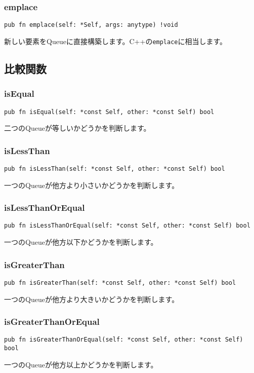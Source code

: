 \documentclass{ltjsarticle}
\begin{document}
\subsubsection{emplace}
\begin{lstlisting}[style=zigstyle]
pub fn emplace(self: *Self, args: anytype) !void
\end{lstlisting}
新しい要素をQueueに直接構築します。C++の\texttt{emplace}に相当します。

\subsection{比較関数}

\subsubsection{isEqual}
\begin{lstlisting}[style=zigstyle]
pub fn isEqual(self: *const Self, other: *const Self) bool
\end{lstlisting}
二つのQueueが等しいかどうかを判断します。

\subsubsection{isLessThan}
\begin{lstlisting}[style=zigstyle]
pub fn isLessThan(self: *const Self, other: *const Self) bool
\end{lstlisting}
一つのQueueが他方より小さいかどうかを判断します。

\subsubsection{isLessThanOrEqual}
\begin{lstlisting}[style=zigstyle]
pub fn isLessThanOrEqual(self: *const Self, other: *const Self) bool
\end{lstlisting}
一つのQueueが他方以下かどうかを判断します。

\subsubsection{isGreaterThan}
\begin{lstlisting}[style=zigstyle]
pub fn isGreaterThan(self: *const Self, other: *const Self) bool
\end{lstlisting}
一つのQueueが他方より大きいかどうかを判断します。

\subsubsection{isGreaterThanOrEqual}
\begin{lstlisting}[style=zigstyle]
pub fn isGreaterThanOrEqual(self: *const Self, other: *const Self) bool
\end{lstlisting}
一つのQueueが他方以上かどうかを判断します。
\end{document}
